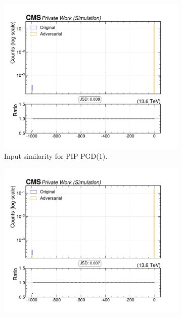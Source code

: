 \begin{figure}[htbp]
  \centering
  \begin{subfigure}[t]{0.32\textwidth}
    \includegraphics[width=\linewidth]{media/output/features/compare/combined_it_1/cmp_global_features_TagVarCSV_trackSip2dValAboveCharm.pdf}
    \caption*{Input similarity for PIP-PGD(1).}
  \end{subfigure}\hfill
  \begin{subfigure}[t]{0.32\textwidth}
    \includegraphics[width=\linewidth]{media/output/features/compare/combined_it_2/cmp_global_features_TagVarCSV_trackSip2dValAboveCharm.pdf}

\end{subfigure}
\end{figure}
